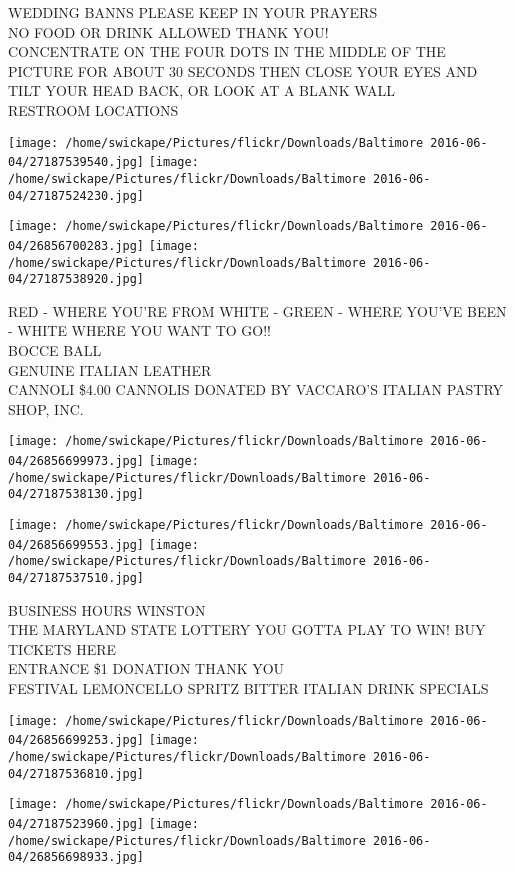 \documentclass[10pt,letterpaper]{article}
\begin{document}
WEDDING BANNS PLEASE KEEP IN YOUR PRAYERS\\
NO FOOD OR DRINK ALLOWED THANK YOU!\\
CONCENTRATE ON THE FOUR DOTS IN THE MIDDLE OF THE PICTURE FOR ABOUT 30 SECONDS THEN CLOSE YOUR EYES AND TILT YOUR HEAD BACK, OR LOOK AT A BLANK WALL\\
RESTROOM LOCATIONS
\pagebreak

\texttt{[image: /home/swickape/Pictures/flickr/Downloads/Baltimore 2016-06-04/27187539540.jpg]}
\texttt{[image: /home/swickape/Pictures/flickr/Downloads/Baltimore 2016-06-04/27187524230.jpg]}

\texttt{[image: /home/swickape/Pictures/flickr/Downloads/Baltimore 2016-06-04/26856700283.jpg]}
\texttt{[image: /home/swickape/Pictures/flickr/Downloads/Baltimore 2016-06-04/27187538920.jpg]}

RED {-} WHERE YOU'RE FROM WHITE {-} GREEN {-} WHERE YOU'VE BEEN {-} WHITE WHERE YOU WANT TO GO!!\\
BOCCE BALL\\
GENUINE ITALIAN LEATHER\\
CANNOLI \$4.00 CANNOLIS DONATED BY VACCARO'S ITALIAN PASTRY SHOP, INC.
\pagebreak

\texttt{[image: /home/swickape/Pictures/flickr/Downloads/Baltimore 2016-06-04/26856699973.jpg]}
\texttt{[image: /home/swickape/Pictures/flickr/Downloads/Baltimore 2016-06-04/27187538130.jpg]}

\texttt{[image: /home/swickape/Pictures/flickr/Downloads/Baltimore 2016-06-04/26856699553.jpg]}
\texttt{[image: /home/swickape/Pictures/flickr/Downloads/Baltimore 2016-06-04/27187537510.jpg]}

BUSINESS HOURS WINSTON\\
THE MARYLAND STATE LOTTERY YOU GOTTA PLAY TO WIN!  BUY TICKETS HERE\\
ENTRANCE \$1 DONATION THANK YOU\\
FESTIVAL LEMONCELLO SPRITZ BITTER ITALIAN DRINK SPECIALS
\pagebreak

\texttt{[image: /home/swickape/Pictures/flickr/Downloads/Baltimore 2016-06-04/26856699253.jpg]}
\texttt{[image: /home/swickape/Pictures/flickr/Downloads/Baltimore 2016-06-04/27187536810.jpg]}

\texttt{[image: /home/swickape/Pictures/flickr/Downloads/Baltimore 2016-06-04/27187523960.jpg]}
\texttt{[image: /home/swickape/Pictures/flickr/Downloads/Baltimore 2016-06-04/26856698933.jpg]}
\end{document}
